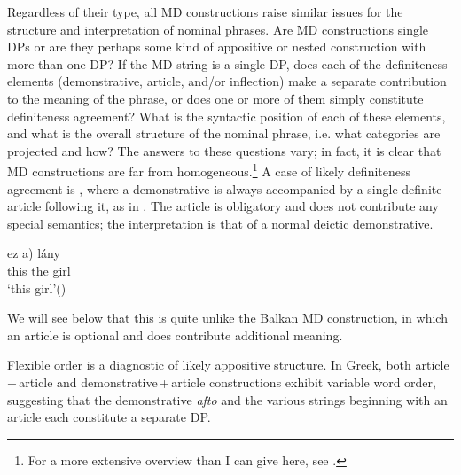 \documentclass[output=paper]{langscibook}
\begin{document}
Regardless of their type, all MD constructions raise similar issues for the structure and interpretation of nominal phrases. Are MD constructions single DPs or are they perhaps some kind of appositive or nested construction with more than one DP? If the MD string is a single DP, does each of the definiteness elements (demonstrative, article, and/or inflection) make a separate contribution to the meaning of the phrase, or does one or more of them simply constitute definiteness agreement? What is the syntactic position of each of these elements, and what is the overall structure of the nominal phrase, i.e. what categories are projected and how? The answers to these questions vary; in fact, it is clear that MD constructions are far from homogeneous.\footnote{For a more extensive overview than I can give here, see \citet{Alexiadou2014}.} A case of likely definiteness agreement is , where a demonstrative is always accompanied by a single definite article following it, as in . The  article is obligatory and does not contribute any special semantics; the interpretation is that of a normal deictic demonstrative.

\ea \label{ex:girl}
\gll ez \minsp{*(} a) lány\\
     this {} the girl\\
\glt `this girl'\hfill ()
\z

\noindent We will see below that this is quite unlike the Balkan  MD construction, in which an article is optional and does contribute additional meaning.

Flexible order is a diagnostic of likely appositive structure. In Greek, both article\,+\,article  and demonstrative\,+\,article  constructions exhibit variable word order, suggesting that the demonstrative \textit{afto} and the various strings beginning with an article each constitute a separate DP.

\end{document}
